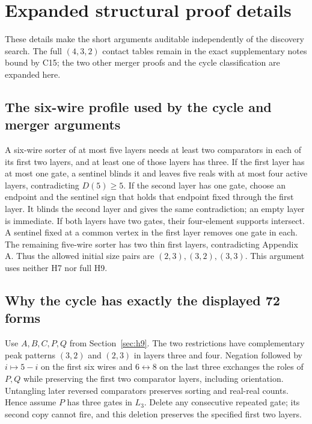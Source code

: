 \documentclass[11pt]{article}
\begin{document}

\clearpage
\section{Expanded structural proof details}\label{app:expanded}
These details make the short arguments auditable independently of the discovery search. The full $(4,3,2)$ contact tables remain in the exact supplementary notes bound by C15; the two other merger proofs and the cycle classification are expanded here.

\subsection{The six-wire profile used by the cycle and merger arguments}
A six-wire sorter of at most five layers needs at least two comparators in each of its first two layers, and at least one of those layers has three. If the first layer has at most one gate, a sentinel blinds it and leaves five reals with at most four active layers, contradicting $D(5)\ge5$. If the second layer has one gate, choose an endpoint and the sentinel sign that holds that endpoint fixed through the first layer. It blinds the second layer and gives the same contradiction; an empty layer is immediate. If both layers have two gates, their four-element supports intersect. A sentinel fixed at a common vertex in the first layer removes one gate in each. The remaining five-wire sorter has two thin first layers, contradicting Appendix A. Thus the allowed initial size pairs are $(2,3),(3,2),(3,3)$. This argument uses neither H7 nor full H9.

\subsection{Why the cycle has exactly the displayed 72 forms}
Use $A,B,C,P,Q$ from Section~\ref{sec:h9}. The two restrictions have complementary peak patterns $(3,2)$ and $(2,3)$ in layers three and four. Negation followed by $i\mapsto5-i$ on the first six wires and $6\leftrightarrow8$ on the last three exchanges the roles of $P,Q$ while preserving the first two comparator layers, including orientation. Untangling later reversed comparators preserves sorting and real-real counts. Hence assume $P$ has three gates in $L_3$. Delete any consecutive repeated gate; its second copy cannot fire, and this deletion preserves the specified first two layers.
\end{document}

